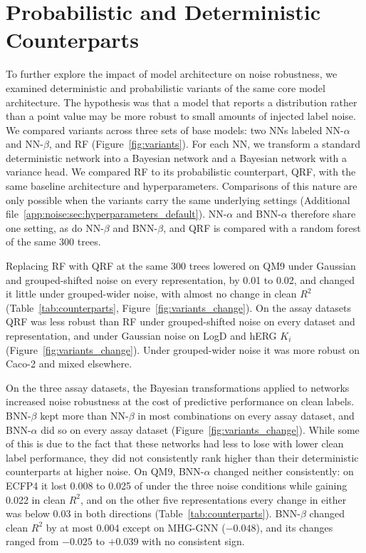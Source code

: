 \section{Probabilistic and Deterministic Counterparts}

To further explore the impact of model architecture on noise robustness, we examined deterministic and probabilistic variants of the same core model architecture. The hypothesis was that a model that reports a distribution rather than a point value may be more robust to small amounts of injected label noise. We compared variants across three sets of base models: two NNs labeled NN-$\alpha$ and NN-$\beta$, and RF (Figure~\ref{fig:variants}). For each NN, we transform a standard deterministic network into a Bayesian network and a Bayesian network with a variance head. We compared RF to its probabilistic counterpart, QRF, with the same baseline architecture and hyperparameters. Comparisons of this nature are only possible when the variants carry the same underlying settings (Additional file~\ref{app:noise:sec:hyperparameters_default}). NN-$\alpha$ and BNN-$\alpha$ therefore share one setting, as do NN-$\beta$ and BNN-$\beta$, and QRF is compared with a random forest of the same 300 trees.

Replacing RF with QRF at the same 300 trees lowered \aucnorm{} on QM9 under Gaussian and grouped-shifted noise on every representation, by 0.01 to 0.02, and changed it little under grouped-wider noise, with almost no change in clean $R^2$ (Table~\ref{tab:counterparts}, Figure~\ref{fig:variants_change}). On the assay datasets QRF was less robust than RF under grouped-shifted noise on every dataset and representation, and under Gaussian noise on LogD and hERG $K_i$ (Figure~\ref{fig:variants_change}). Under grouped-wider noise it was more robust on Caco-2 and mixed elsewhere.

On the three assay datasets, the Bayesian transformations applied to networks increased noise robustness at the cost of predictive performance on clean labels. BNN-$\beta$ kept more \aucnorm{} than NN-$\beta$ in most combinations on every assay dataset, and BNN-$\alpha$ did so on every assay dataset (Figure~\ref{fig:variants_change}). While some of this is due to the fact that these networks had less to lose with lower clean label performance, they did not consistently rank higher than their deterministic counterparts at higher noise. On QM9, BNN-$\alpha$ changed neither consistently: on ECFP4 it lost 0.008 to 0.025 of \aucnorm{} under the three noise conditions while gaining 0.022 in clean $R^2$, and on the other five representations every change in either was below 0.03 in both directions (Table~\ref{tab:counterparts}). BNN-$\beta$ changed clean $R^2$ by at most 0.004 except on MHG-GNN ($-0.048$), and its \aucnorm{} changes ranged from $-0.025$ to $+0.039$ with no consistent sign.

